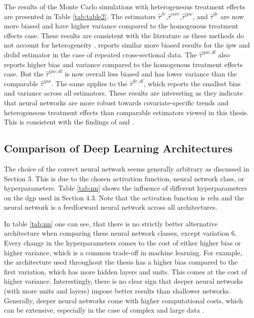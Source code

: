 The results of the Monte Carlo simulations with heterogeneous treatment effects are presented in Table \ref{tab:table2}.
The estimators $\hat{\tau}^{fe}$,$\hat{\tau}^{corr}$,$\hat{\tau}^{ipw}$, and $\hat{\tau}^{dr}$ are now more biased and have higher variance compared to the homogenous treatment effects case.
These results are consistent with the literature as these methods do not account for heterogeneity \citep{hansen2022econometrics}.
\citet{manfeDifferenceInDifferenceDesignRepeated} reports similar more biased results for the \ac{ipw} and \ac{drdid} estimator in the case of repeated cross-sectional data.
The $\hat{\tau}^{ipw,dl}$ also reports higher bias and variance compared to the homogenous treatment effects case.
But the $\hat{\tau}^{ipw,dl}$ is now overall less biased and has lower variance than the comparable $\hat{\tau}^{ipw}$.
The same applies to the $\hat{\tau}^{dr,dl}$, which reports the smallest bias and variance across all estimators.
These results are interesting as they indicate that neural networks are more robust towards covariate-specific trends and heterogeneous treatment effects than comparable estimators viewed in this thesis.
This is consistent with the findings of \citet{farrellDeepNeuralNetworks2021} and \citet{chernozhukovDoubleDebiasedMachine2018}.

\subsection{Comparison of Deep Learning Architectures}

The choice of the correct neural network seems generally arbitrary as discussed in Section 3.
This is due to the chosen activation function, neural network class, or hyperparameters.
Table \ref{tab:nn} shows the influence of different hyperparameters on the \ac{dgp} used in Section 4.3.
Note that the activation function is \ac{relu} and the neural network is a feedforward neural network across all architectures.

In table \ref{tab:nn} one can see, that there is no strictly better alternative architecture when comparing these neural network classes, except variation 6.
Every change in the hyperparameters comes to the cost of either higher bias or higher variance, which is a common trade-off in machine learning.
For example, the architecture used throughout the thesis has a higher bias compared to the first variation, which has more hidden layers and units.
This comes at the cost of higher variance.
Interestingly, there is no clear sign that deeper neural networks (with more units and layers) impose better results than shallower networks.
Generally, deeper neural networks come with higher computational costs, which can be extensive, especially in the case of complex and large data \citep{thompson2020computational}.

